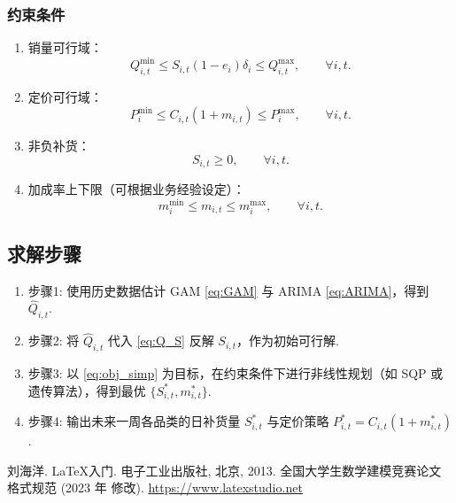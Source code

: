 \documentclass{cumcmthesis}
\begin{document}
\subsubsection{约束条件}
\begin{enumerate}
\item 销量可行域：
      \[
      Q_{i,t}^{\min} \le S_{i,t}(1-e_i)\delta_i \le Q_{i,t}^{\max},
      \qquad \forall i,t.
      \]
\item 定价可行域：
      \[
      P_{i}^{\min} \le C_{i,t}(1+m_{i,t}) \le P_{i}^{\max},
      \qquad \forall i,t.
      \]
\item 非负补货：
      \[
      S_{i,t} \ge 0,\qquad \forall i,t.
      \]
\item 加成率上下限（可根据业务经验设定）：
      \[
      m_{i}^{\min} \le m_{i,t} \le m_{i}^{\max},
      \qquad \forall i,t.
      \]
\end{enumerate}

\subsection{求解步骤}
\begin{enumerate}
\item 步骤1: 使用历史数据估计 GAM \eqref{eq:GAM} 与 ARIMA \eqref{eq:ARIMA}，得到 $\widehat{Q}_{i,t}$.
\item 步骤2: 将 $\widehat{Q}_{i,t}$ 代入 \eqref{eq:Q_S} 反解 $S_{i,t}$，作为初始可行解.
\item 步骤3: 以 \eqref{eq:obj_simp} 为目标，在约束条件下进行非线性规划（如 SQP 或遗传算法），得到最优 $\{S_{i,t}^*,m_{i,t}^*\}$.
\item 步骤4: 输出未来一周各品类的日补货量 $S_{i,t}^*$ 与定价策略 $P_{i,t}^*=C_{i,t}(1+m_{i,t}^*)$.
\end{enumerate}

\begin{thebibliography}{9}%
    刘海洋.
    \newblock \LaTeX {}入门\allowbreak[J].
    \newblock 电子工业出版社, 北京, 2013.
    全国大学生数学建模竞赛论文格式规范 (2023 年 修改).
     \url{https://www.latexstudio.net}
\end{thebibliography}
\end{document}
